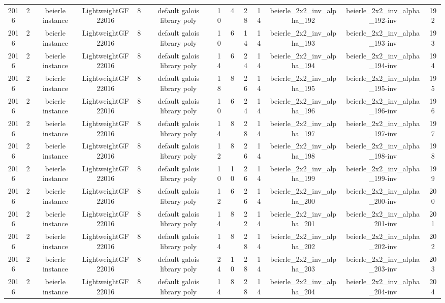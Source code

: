 \begin{tabular}{c c c c c c c c c c c c c}
2016 & 2 & beierle instance & LightweightGF22016 & 8 & default galois library poly & 10 & 4 & 28 & 14 & beierle_2x2_inv_alpha_192 & beierle_2x2_inv_alpha_192-inv & 192 \\
2016 & 2 & beierle instance & LightweightGF22016 & 8 & default galois library poly & 10 & 6 & 14 & 14 & beierle_2x2_inv_alpha_193 & beierle_2x2_inv_alpha_193-inv & 193 \\
2016 & 2 & beierle instance & LightweightGF22016 & 8 & default galois library poly & 14 & 6 & 24 & 14 & beierle_2x2_inv_alpha_194 & beierle_2x2_inv_alpha_194-inv & 194 \\
2016 & 2 & beierle instance & LightweightGF22016 & 8 & default galois library poly & 18 & 8 & 26 & 14 & beierle_2x2_inv_alpha_195 & beierle_2x2_inv_alpha_195-inv & 195 \\
2016 & 2 & beierle instance & LightweightGF22016 & 8 & default galois library poly & 10 & 6 & 24 & 14 & beierle_2x2_inv_alpha_196 & beierle_2x2_inv_alpha_196-inv & 196 \\
2016 & 2 & beierle instance & LightweightGF22016 & 8 & default galois library poly & 14 & 8 & 28 & 14 & beierle_2x2_inv_alpha_197 & beierle_2x2_inv_alpha_197-inv & 197 \\
2016 & 2 & beierle instance & LightweightGF22016 & 8 & default galois library poly & 12 & 8 & 26 & 14 & beierle_2x2_inv_alpha_198 & beierle_2x2_inv_alpha_198-inv & 198 \\
2016 & 2 & beierle instance & LightweightGF22016 & 8 & default galois library poly & 10 & 10 & 26 & 14 & beierle_2x2_inv_alpha_199 & beierle_2x2_inv_alpha_199-inv & 199 \\
2016 & 2 & beierle instance & LightweightGF22016 & 8 & default galois library poly & 12 & 6 & 26 & 14 & beierle_2x2_inv_alpha_200 & beierle_2x2_inv_alpha_200-inv & 200 \\
2016 & 2 & beierle instance & LightweightGF22016 & 8 & default galois library poly & 14 & 8 & 22 & 14 & beierle_2x2_inv_alpha_201 & beierle_2x2_inv_alpha_201-inv & 201 \\
2016 & 2 & beierle instance & LightweightGF22016 & 8 & default galois library poly & 14 & 8 & 28 & 14 & beierle_2x2_inv_alpha_202 & beierle_2x2_inv_alpha_202-inv & 202 \\
2016 & 2 & beierle instance & LightweightGF22016 & 8 & default galois library poly & 24 & 10 & 28 & 14 & beierle_2x2_inv_alpha_203 & beierle_2x2_inv_alpha_203-inv & 203 \\
2016 & 2 & beierle instance & LightweightGF22016 & 8 & default galois library poly & 14 & 8 & 28 & 14 & beierle_2x2_inv_alpha_204 & beierle_2x2_inv_alpha_204-inv & 204 \\

\end{tabular}
